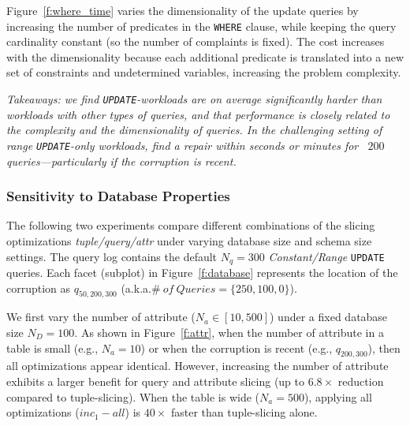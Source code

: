 \smallskip
{}
Figure~\ref{f:where_time} varies the dimensionality of the update queries by increasing the number of predicates in the \texttt{WHERE} clause, while keeping the query cardinality constant (so the number of complaints is fixed).
The cost increases with the dimensionality because each additional predicate is translated into a new set of constraints and undetermined variables, increasing the problem complexity.
 

\smallskip
\textit{
  Takeaways: we find \texttt{UPDATE}-workloads are on average significantly harder than workloads with other types of queries, and that
  performance is closely related to the complexity and the dimensionality of queries. 
  In the challenging setting of range \texttt{UPDATE}-only workloads, \sys find a repair within seconds or minutes for ~$200$ queries---particularly if the corruption is recent. 
}




\subsubsection{Sensitivity to Database Properties}
\label{sec:experiments:dbproperties}

The following two experiments compare different combinations of the slicing optimizations \emph{tuple/query/attr} under varying database size and schema size settings.  
The query log contains the default $N_q = 300$ {\it Constant/Range} \texttt{UPDATE} queries.
Each facet (subplot) in Figure~\ref{f:database} represents the location of the corruption as $q_{50,200,300}$ (a.k.a.$\#\ of\ Queries = \{250,100,0\}$).

 
We first vary the number of attribute ($N_a \in [10, 500]$) under a fixed database size $N_D = 100$.
As shown in Figure~\ref{f:attr}, when the number of attribute in a table is small (e.g., $N_a=10$) or when the corruption is recent (e.g., $q_{200, 300}$), then all optimizations appear identical. 
However, increasing the number of attribute exhibits a larger benefit for query and attribute slicing (up to $6.8\times$ reduction compared to tuple-slicing).
When the table is wide ($N_a = 500$), applying all optimizations ($inc_1-all$) is $40\times$ faster than tuple-slicing alone.  


